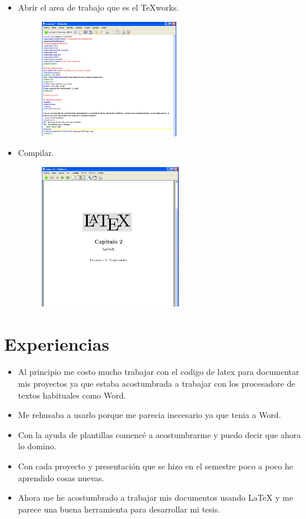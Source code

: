\begin{itemize}
         \item Abrir el area de trabajo que es el TeXworks.
             \begin{figure}[htb]
                \centering
                \includegraphics[width=0.57\textwidth]{./imagenes2/image1.png}
             \end{figure}
        \item Compilar.
            \begin{figure}[htb]
               \centering
                \includegraphics[width=0.58\textwidth]{./imagenes2/image2.png}
             \end{figure}

        \end{itemize}

 \section{ Experiencias}
  \begin{itemize}
\item Al principio me costo mucho trabajar con el codigo de latex para documentar mis proyectos ya que estaba acostumbrada a trabajar con los procesadore de textos habituales como Word.
\item Me rehusaba a usarlo porque me parecia inecesario ya que tenia a Word.
\item Con la ayuda de plantillas comencé a acostumbrarme y puedo decir que ahora lo domino. 
\item Con cada proyecto y presentación que se hizo en el semestre poco a poco he aprendido cosas nuevas.
\item Ahora me he acostumbrado a trabajar mis documentos usando LaTeX y me parece una buena herramienta para desarrollar mi tesis.
\end{itemize}
